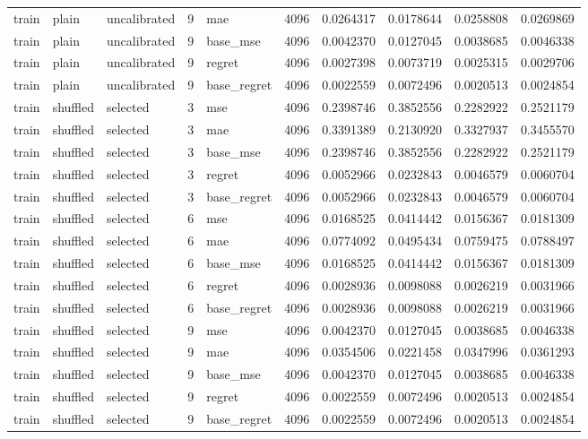\begin{tabular}{lllrlrrrrr}
train & plain & uncalibrated & 9 & mae & 4096 & 0.0264317 & 0.0178644 & 0.0258808 & 0.0269869 \\
train & plain & uncalibrated & 9 & base_mse & 4096 & 0.0042370 & 0.0127045 & 0.0038685 & 0.0046338 \\
train & plain & uncalibrated & 9 & regret & 4096 & 0.0027398 & 0.0073719 & 0.0025315 & 0.0029706 \\
train & plain & uncalibrated & 9 & base_regret & 4096 & 0.0022559 & 0.0072496 & 0.0020513 & 0.0024854 \\
train & shuffled & selected & 3 & mse & 4096 & 0.2398746 & 0.3852556 & 0.2282922 & 0.2521179 \\
train & shuffled & selected & 3 & mae & 4096 & 0.3391389 & 0.2130920 & 0.3327937 & 0.3455570 \\
train & shuffled & selected & 3 & base_mse & 4096 & 0.2398746 & 0.3852556 & 0.2282922 & 0.2521179 \\
train & shuffled & selected & 3 & regret & 4096 & 0.0052966 & 0.0232843 & 0.0046579 & 0.0060704 \\
train & shuffled & selected & 3 & base_regret & 4096 & 0.0052966 & 0.0232843 & 0.0046579 & 0.0060704 \\
train & shuffled & selected & 6 & mse & 4096 & 0.0168525 & 0.0414442 & 0.0156367 & 0.0181309 \\
train & shuffled & selected & 6 & mae & 4096 & 0.0774092 & 0.0495434 & 0.0759475 & 0.0788497 \\
train & shuffled & selected & 6 & base_mse & 4096 & 0.0168525 & 0.0414442 & 0.0156367 & 0.0181309 \\
train & shuffled & selected & 6 & regret & 4096 & 0.0028936 & 0.0098088 & 0.0026219 & 0.0031966 \\
train & shuffled & selected & 6 & base_regret & 4096 & 0.0028936 & 0.0098088 & 0.0026219 & 0.0031966 \\
train & shuffled & selected & 9 & mse & 4096 & 0.0042370 & 0.0127045 & 0.0038685 & 0.0046338 \\
train & shuffled & selected & 9 & mae & 4096 & 0.0354506 & 0.0221458 & 0.0347996 & 0.0361293 \\
train & shuffled & selected & 9 & base_mse & 4096 & 0.0042370 & 0.0127045 & 0.0038685 & 0.0046338 \\
train & shuffled & selected & 9 & regret & 4096 & 0.0022559 & 0.0072496 & 0.0020513 & 0.0024854 \\
train & shuffled & selected & 9 & base_regret & 4096 & 0.0022559 & 0.0072496 & 0.0020513 & 0.0024854 \\

\end{tabular}
